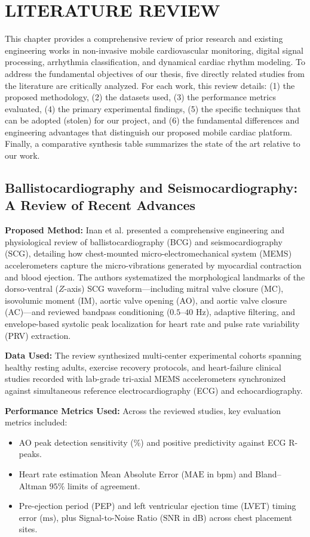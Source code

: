 \chapter{LITERATURE REVIEW}

This chapter provides a comprehensive review of prior research and existing engineering works in non-invasive mobile cardiovascular monitoring, digital signal processing, arrhythmia classification, and dynamical cardiac rhythm modeling. To address the fundamental objectives of our thesis, five directly related studies from the literature are critically analyzed. For each work, this review details: (1) the proposed methodology, (2) the datasets used, (3) the performance metrics evaluated, (4) the primary experimental findings, (5) the specific techniques that can be adopted (stolen) for our project, and (6) the fundamental differences and engineering advantages that distinguish our proposed mobile cardiac platform. Finally, a comparative synthesis table summarizes the state of the art relative to our work.

\section{Ballistocardiography and Seismocardiography: A Review of Recent Advances \cite{inan2015ballistocardiography}}

\textbf{Proposed Method:} Inan et al. \cite{inan2015ballistocardiography} presented a comprehensive engineering and physiological review of ballistocardiography (BCG) and seismocardiography (SCG), detailing how chest-mounted micro-electromechanical system (MEMS) accelerometers capture the micro-vibrations generated by myocardial contraction and blood ejection. The authors systematized the morphological landmarks of the dorso-ventral ($Z$-axis) SCG waveform---including mitral valve closure (MC), isovolumic moment (IM), aortic valve opening (AO), and aortic valve closure (AC)---and reviewed bandpass conditioning ($0.5\text{--}40\text{ Hz}$), adaptive filtering, and envelope-based systolic peak localization for heart rate and pulse rate variability (PRV) extraction.

\textbf{Data Used:} The review synthesized multi-center experimental cohorts spanning healthy resting adults, exercise recovery protocols, and heart-failure clinical studies recorded with lab-grade tri-axial MEMS accelerometers synchronized against simultaneous reference electrocardiography (ECG) and echocardiography.

\textbf{Performance Metrics Used:} Across the reviewed studies, key evaluation metrics included:
\begin{itemize}
    \item AO peak detection sensitivity ($\%$) and positive predictivity against ECG R-peaks.
    \item Heart rate estimation Mean Absolute Error ($\text{MAE}$ in bpm) and Bland--Altman $95\%$ limits of agreement.
    \item Pre-ejection period (PEP) and left ventricular ejection time (LVET) timing error ($\text{ms}$), plus Signal-to-Noise Ratio ($\text{SNR}$ in dB) across chest placement sites.
\end{itemize}

